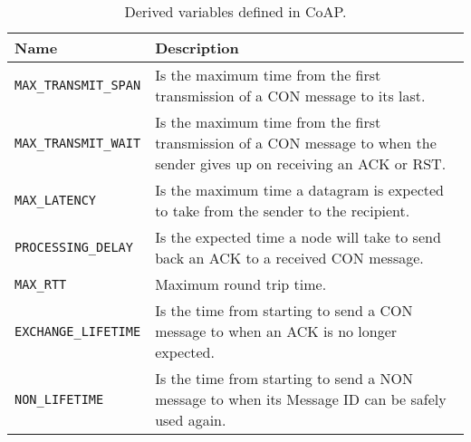 	\begin{table}[h!]
		\begin{center}
			
			\begin{tabularx}{\textwidth}{|l|X|}
				\hline
				\textbf{Name} & \textbf{Description}\\\hline
				\texttt{MAX\_TRANSMIT\_SPAN} & Is the maximum time from the first transmission of a CON message to its last.\\\hline
				\texttt{MAX\_TRANSMIT\_WAIT} & Is the maximum time from the first transmission of a CON message to when the sender gives up on receiving an ACK or RST.\\\hline
				\texttt{MAX\_LATENCY} & Is the maximum time a datagram is expected to take from the sender to the recipient.\\\hline
				\texttt{PROCESSING\_DELAY} & Is the expected time a node will take to send back an ACK to a received CON message.\\\hline
				\texttt{MAX\_RTT} & Maximum round trip time.\\\hline
				\texttt{EXCHANGE\_LIFETIME} & Is the time from starting to send a CON message to when an ACK is no longer expected.\\\hline
				\texttt{NON\_LIFETIME} & Is the time from starting to send a NON message to when its Message ID can be safely used again.\\\hline
			\end{tabularx}
			\caption{Derived variables defined in CoAP.}
			\label{tab:table4}
		\end{center}
	\end{table}	